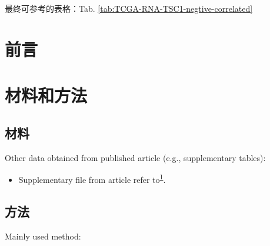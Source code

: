 \documentclass[
]{article}
\providecommand{\tightlist}{%
  \setlength{\itemsep}{0pt}\setlength{\parskip}{0pt}}
\begin{document}
最终可参考的表格：Tab. \ref{tab:TCGA-RNA-TSC1-negtive-correlated}

\hypertarget{introduction}{%
\section{前言}\label{introduction}}

\hypertarget{methods}{%
\section{材料和方法}\label{methods}}

\hypertarget{ux6750ux6599}{%
\subsection{材料}\label{ux6750ux6599}}

Other data obtained from published article (e.g., supplementary tables):

\begin{itemize}
\tightlist
\item
  Supplementary file from article refer to\textsuperscript{\protect\hyperlink{ref-ProteomicsProfShao2022}{1}}.
\end{itemize}

\hypertarget{ux65b9ux6cd5}{%
\subsection{方法}\label{ux65b9ux6cd5}}

Mainly used method:
\end{document}

